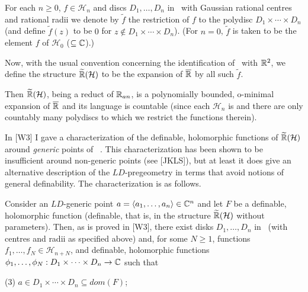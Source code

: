 \documentclass[12pt,nodate]{article}
\begin{document}
 \vspace{3mm}
 
 \noindent
 For each $n \geq 0$, $f \in \mathcal{H}_n$ and discs $D_1 , \ldots , D_n$ in \C\ with Gaussian rational centres and rational radii we denote by $\tilde{f}$ the restriction of $f$ to the polydisc $D_1 \times \cdots \times D_n$ (and define $\tilde{f}(z)$ to be $0$ for $z \notin D_1 \times \cdots \times D_n$). (For $n=0$, $\tilde{f}$ is taken to be the element $f$ of  $\mathcal{H}_0$ ($\subseteq \mathbb{C}$).)
 
 
 
 Now, with the usual convention concerning the identification of \C\ with $\mathbb{R}^2$, we define the structure $\widetilde{\mathbb{R}}( 
 \mathcal{H})$ to be the expansion of $\overline{\mathbb{R}}$ by all such $\tilde{f}$.
 
 \vspace{2mm}
 
 Then $\widetilde{\mathbb{R}}( \mathcal{H})$, being a reduct of $\mathbb{R}_{an}$, is a polynomially bounded, o-minimal expansion of $\overline{\mathbb{R}}$ and its language is countable (since each 
$\mathcal{H}_n$ is and there are only countably many polydiscs to which we restrict the functions therein).

\vspace{2mm}

In [W3] I gave a characterization of the definable, holomorphic functions of  $\widetilde{\mathbb{R}}(\mathcal{H})$ around \emph{generic} points of \Cn\ . This characterization has been shown to be insufficient around non-generic points (see [JKLS]), but at least it does give an alternative  description of the $LD$-pregeometry in terms that avoid notions of general definability. The characterization is as follows.

\vspace{2mm}

Consider an $LD$-generic point $a = \langle a_1 , \ldots , a_n \rangle \in \mathbb{C}^{n}$ and let $F$ be a definable, holomorphic function (definable, that is, in the structure $\widetilde{\mathbb{R}}( \mathcal{H})$ without parameters). Then, as is proved in [W3], there exist disks $D_1 , \ldots , D_n$ in \C\  (with centres and radii as specified above) and, for some $N \geq 1$, functions $f_1 , \ldots , f_N \in \mathcal{H}_{n+N}$, and definable, holomorphic functions $\phi_1 , \ldots , \phi_N :  D_1 \times \cdots \times D_n \rightarrow \mathbb{C}$ such that

\vspace{3mm}

\noindent  
(3) \hspace{2mm} $a \in D_1 \times \cdots \times D_n \subseteq dom(F)$;
 
\end{document}
